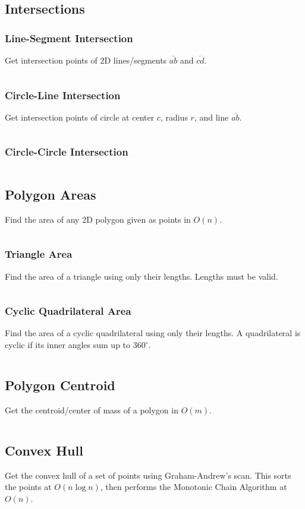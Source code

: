 \documentclass[8pt,a4paper,landscape,oneside]{amsart}
\newcommand{\code}[1]{\inputminted[fontsize=\normalsize,baselinestretch=1]{cpp}{_code/#1}}
\begin{document}
\begin{multicols*}{3}
	\subsection{Intersections}
    \subsubsection{Line-Segment Intersection}
      Get intersection points of 2D lines/segments $\overline{ab}$ and $\overline{cd}$.
      \code{geom/line-seg-isect.cpp}
    \subsubsection{Circle-Line Intersection}
      Get intersection points of circle at center $c$, radius $r$, and line $\overline{ab}$.
      \code{geom/circ-line-isect.cpp}
    \subsubsection{Circle-Circle Intersection}
      \code{geom/circ-circ-isect.cpp}
	\subsection{Polygon Areas}
    Find the area of any 2D polygon given as points in $O(n)$.
    \code{geom/poly-area.cpp}
    \subsubsection{Triangle Area}
      Find the area of a triangle using only their lengths. Lengths must be valid.
      \code{geom/tri-area.cpp}
    \subsubsection*{Cyclic Quadrilateral Area}
      Find the area of a cyclic quadrilateral using only their lengths. A quadrilateral is
      cyclic if its inner angles sum up to $360^\circ$.
      \code{geom/cyc-quad-area.cpp}
  \subsection{Polygon Centroid}
    Get the centroid/center of mass of a polygon in $O(m)$.
    \code{geom/poly-centroid.cpp}
  \subsection{Convex Hull}
    Get the convex hull of a set of points using Graham-Andrew's scan. This sorts the
    points at $O(n \log n)$, then performs the Monotonic Chain Algorithm at $O(n)$.
    \code{geom/convex-hull.cpp}

\end{multicols*}
\end{document}
